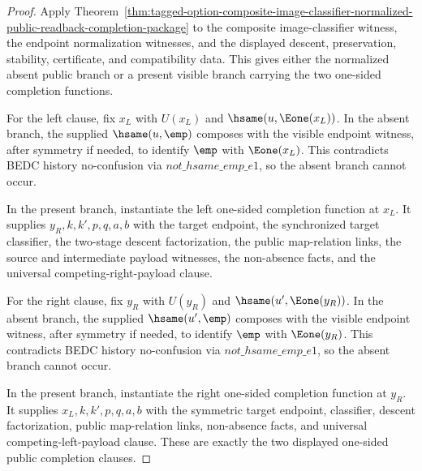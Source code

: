 \begin{proof}
Apply
Theorem~\ref{thm:tagged-option-composite-image-classifier-normalized-public-readback-completion-package}
to the composite image-classifier witness, the endpoint normalization witnesses,
and the displayed descent, preservation, stability, certificate, and
compatibility data. This gives either the normalized absent public branch or a
present visible branch carrying the two one-sided completion functions.

For the left clause, fix $x_L$ with $U(x_L)$ and $\hsame(u,\Eone(x_L))$. In the
absent branch, the supplied $\hsame(u,\emp)$ composes with the visible endpoint
witness, after symmetry if needed, to identify $\emp$ with $\Eone(x_L)$. This
contradicts BEDC history no-confusion via $not\_hsame\_emp\_e1$, so the absent
branch cannot occur.

In the present branch, instantiate the left one-sided completion function at
$x_L$. It supplies $y_R,k,k',p,q,a,b$ with the target endpoint, the synchronized
target classifier, the two-stage descent factorization, the public map-relation
links, the source and intermediate payload witnesses, the non-absence facts, and
the universal competing-right-payload clause.

For the right clause, fix $y_R$ with $U(y_R)$ and $\hsame(u',\Eone(y_R))$. In
the absent branch, the supplied $\hsame(u',\emp)$ composes with the visible
endpoint witness, after symmetry if needed, to identify $\emp$ with
$\Eone(y_R)$. This contradicts BEDC history no-confusion via
$not\_hsame\_emp\_e1$, so the absent branch cannot occur.

In the present branch, instantiate the right one-sided completion function at
$y_R$. It supplies $x_L,k,k',p,q,a,b$ with the symmetric target endpoint,
classifier, descent factorization, public map-relation links, non-absence
facts, and universal competing-left-payload clause. These are exactly the two
displayed one-sided public completion clauses.
\end{proof}

